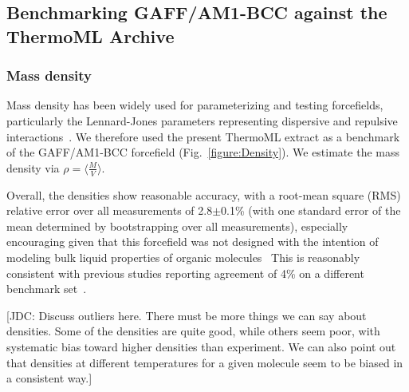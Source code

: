 \documentclass[aps,pre,twocolumn,nofootinbib,superscriptaddress,linenumbers]{revtex4-1}
\begin{document}

\subsection{Benchmarking GAFF/AM1-BCC against the ThermoML Archive}

\subsubsection{Mass density}

Mass density has been widely used for parameterizing and testing forcefields, particularly the Lennard-Jones parameters representing dispersive and repulsive interactions~\cite{jorgensen1983comparison, jorgensen1984optimized}.
We therefore used the present ThermoML extract as a benchmark of the GAFF/AM1-BCC forcefield (Fig.~\ref{figure:Density}).  
We estimate the mass density via $\rho = \langle \frac{M}{V} \rangle$.

Overall, the densities show reasonable accuracy, with a root-mean square (RMS) relative error over all measurements of 2.8$\pm$0.1\% (with one standard error of the mean determined by bootstrapping over all measurements), especially encouraging given that this forcefield was not designed with the intention of modeling bulk liquid properties of organic molecules~\cite{gaff}
This is reasonably consistent with previous studies reporting agreement of 4\% on a different benchmark set~\cite{caleman2011force}.

{\color{red}[JDC: Discuss outliers here.  There must be more things we can say about densities.  Some of the densities are quite good, while others seem poor, with systematic bias toward higher densities than experiment.  We can also point out that densities at different temperatures for a given molecule seem to be biased in a consistent way.]}

\end{document}
